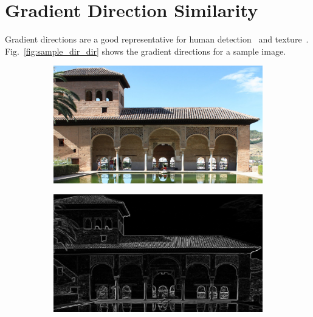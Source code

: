 \section{Gradient Direction Similarity}
Gradient directions are a good representative for human detection~\cite{Dalal2005} and texture~\cite{Wu2015}. Fig.~\ref{fig:sample_dir_dir} shows the gradient directions for a sample image.
\begin{figure}
     \centering
     \begin{subfigure}[b]{0.3\textwidth}
         \centering
         \includegraphics[width=\textwidth]{./figs/org009}
         \caption{}
         \label{fig:sample_dir}
     \end{subfigure}
     \hfill
     \begin{subfigure}[b]{0.3\textwidth}
         \centering
         \includegraphics[width=\textwidth]{./figs/mg_map_ref}
         \caption{}
         \label{fig:sample_dir_mag}
     \end{subfigure}
     \hfill
     \begin{subfigure}[b]{0.3\textwidth}

\end{subfigure}
\end{figure}
